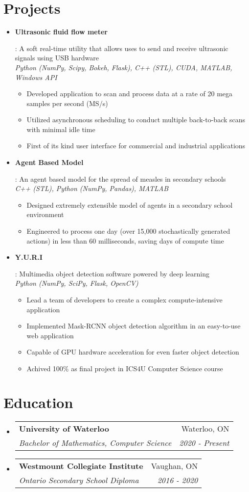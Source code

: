 \documentclass[letterpaper,10pt]{article}
\makeatletter
\newcommand{\resumeItem}[2]{
  \item\small{
    \textbf{#1}{: #2 \vspace{-2pt}}
  }
}
\newcommand{\resumeSubheading}[4]{
  \vspace{-1pt}\item[]
  \begin{tabular*}{0.98\textwidth}{l@{\extracolsep{\fill}}r}
      \hspace{-10pt}\textbf{#1} & #2 \\
      \hspace{-10pt}\textit{\small#3} & \textit{\small #4} \\
    \end{tabular*}\vspace{-5pt}
}
\newcommand{\resumeSubItem}[2]{\resumeItem{#1}{#2}\vspace{-4pt}}
\newcommand{\resumeSubHeadingListStart}{\begin{itemize}[leftmargin=*]}
\newcommand{\resumeSubHeadingListEnd}{\end{itemize}}
\newcommand{\shorterSection}[1]{\vspace{-10pt}\section{#1}}
\makeatother
\begin{document}
\shorterSection{Projects}
  \resumeSubHeadingListStart
    \resumeSubItem{Ultrasonic fluid flow meter}
     {A soft real-time utility that allows uses to send and receive ultrasonic signals using USB hardware \\
     \emph{Python (NumPy, Scipy, Bokeh, Flask), C++ (STL), CUDA, MATLAB, Windows API}
        \vspace{-5pt}
        \begin{itemize}
            \item Developed application to scan and process data at a rate of 20 mega samples per second (MS/s)
            \item Utilized asynchronous scheduling to conduct multiple back-to-back scans with minimal idle time
            \item First of its kind user interface for commercial and industrial applications
        \end{itemize}
     }
     \resumeSubItem{Agent Based Model}
     {An agent based model for the spread of measles in secondary schools \\
     \emph{C++ (STL), Python (NumPy, Pandas), MATLAB}
        \vspace{-5pt}
        \begin{itemize}
            \item Designed extremely extensible model of agents in a secondary school environment
            \item Engineered to process one day (over 15,000 stochastically generated actions) in less than 60 milliseconds, saving days of compute time
        \end{itemize}
     }
     \resumeSubItem{Y.U.R.I}
     {Multimedia object detection software powered by deep learning \\
     \emph{Python (NumPy, SciPy, Flask, OpenCV)}
        \vspace{-5pt}
        \begin{itemize}
            \item Lead a team of developers to create a complex compute-intensive application
            \item Implemented Mask-RCNN object detection algorithm in an easy-to-use web application
            \item Capable of GPU hardware acceleration for even faster object detection
            \item Achived 100\% as final project in ICS4U Computer Science course 
        \end{itemize}
     }
  \resumeSubHeadingListEnd

\shorterSection{Education}
  \resumeSubHeadingListStart
    \resumeSubheading
      {University of Waterloo}{Waterloo, ON}
      {Bachelor of Mathematics, Computer Science}{2020 - Present}{}
    \resumeSubheading
      {Westmount Collegiate Institute}{Vaughan, ON}
      {Ontario Secondary School Diploma}{2016 - 2020}{}
   
  \resumeSubHeadingListEnd
\end{document}
